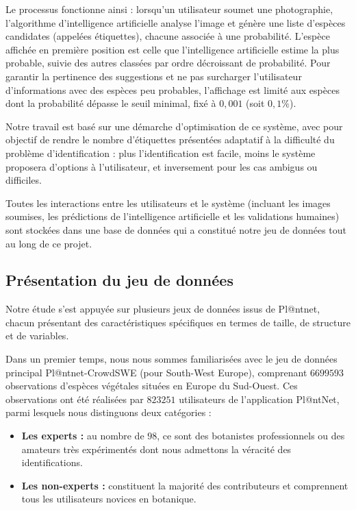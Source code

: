 \documentclass[a4paper,12pt]{article}
\begin{document}
Le processus fonctionne ainsi : lorsqu'un utilisateur soumet une photographie, l'algorithme d'intelligence artificielle analyse l'image et génère une liste d'espèces candidates (appelées étiquettes), chacune associée à une probabilité. L'espèce affichée en première position est celle que l'intelligence artificielle estime la plus probable, suivie des autres classées par ordre décroissant de probabilité. Pour garantir la pertinence des suggestions et ne pas surcharger l'utilisateur d'informations avec des espèces peu probables, l'affichage est limité aux espèces dont la probabilité dépasse le seuil minimal, fixé à $0,001$ (soit $0,1\%$).

\vspace{0.2cm}

Notre travail est basé sur une démarche d'optimisation de ce système, avec pour objectif de rendre le nombre d'étiquettes présentées adaptatif à la difficulté du problème d'identification : plus l'identification est facile, moins le système proposera d'options à l'utilisateur, et inversement pour les cas ambigus ou difficiles.

\vspace{0.2cm}

Toutes les interactions entre les utilisateurs et le système (incluant les images soumises, les prédictions de l'intelligence artificielle et les validations humaines) sont stockées dans une base de données qui a constitué notre jeu de données tout au long de ce projet.


\subsection{Présentation du jeu de données}

Notre étude s'est appuyée sur plusieurs jeux de données issus de Pl@ntnet, chacun présentant des caractéristiques spécifiques en termes de taille, de structure et de variables.

\vspace{0.2cm}

Dans un premier temps, nous nous sommes familiarisées avec le jeu de données principal Pl@ntnet-CrowdSWE (pour South-West Europe), comprenant $\num{6 699 593}$ observations d'espèces végétales situées en Europe du Sud-Ouest. Ces observations ont été réalisées par $\num{823 251}$ utilisateurs de l'application Pl@ntNet, parmi lesquels nous distinguons deux catégories : 
\begin{itemize}
    \item \textbf{Les experts :} au nombre de $98$, ce sont des botanistes professionnels ou des amateurs très expérimentés dont nous admettons la véracité des identifications.
    \item \textbf{Les non-experts :} constituent la majorité des contributeurs et comprennent tous les utilisateurs novices en botanique.
\end{itemize}
\end{document}

